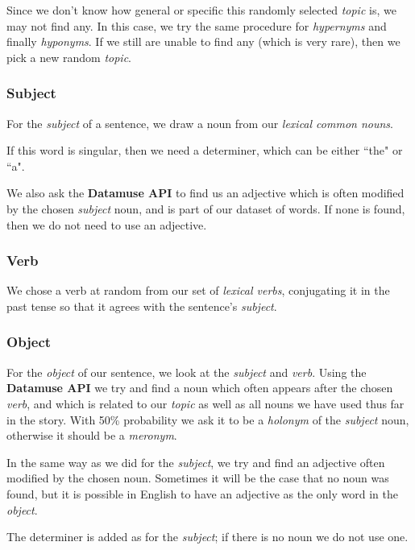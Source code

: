 Since we don't know how general or specific this randomly selected \textit{topic} is, we may not find any. In this case, we try the same procedure for \textit{hypernyms} and finally \textit{hyponyms}. If we still are unable to find any (which is very rare), then we pick a new random \textit{topic}.

\subsubsection{Subject}

For the \textit{subject} of a sentence, we draw a noun from our \textit{lexical common nouns}.

If this word is singular, then we need a determiner, which can be either ``the" or ``a".

We also ask the \textbf{Datamuse API} to find us an adjective which is often modified by the chosen \textit{subject} noun, and is part of our dataset of words. If none is found, then we do not need to use an adjective.

\subsubsection{Verb}

We chose a verb at random from our set of \textit{lexical verbs}, conjugating it in the past tense so that it agrees with the sentence's \textit{subject}.

\subsubsection{Object}

For the \textit{object} of our sentence, we look at the \textit{subject} and \textit{verb}. Using the \textbf{Datamuse API} we try and find a noun which often appears after the chosen \textit{verb}, and which is related to our \textit{topic} as well as all nouns we have used thus far in the story. With 50\% probability we ask it to be a \textit{holonym} of the \textit{subject} noun, otherwise it should be a \textit{meronym}.

In the same way as we did for the \textit{subject}, we try and find an adjective often modified by the chosen noun. Sometimes it will be the case that no noun was found, but it is possible in English to have an adjective as the only word in the \textit{object}.

The determiner is added as for the \textit{subject}; if there is no noun we do not use one.

